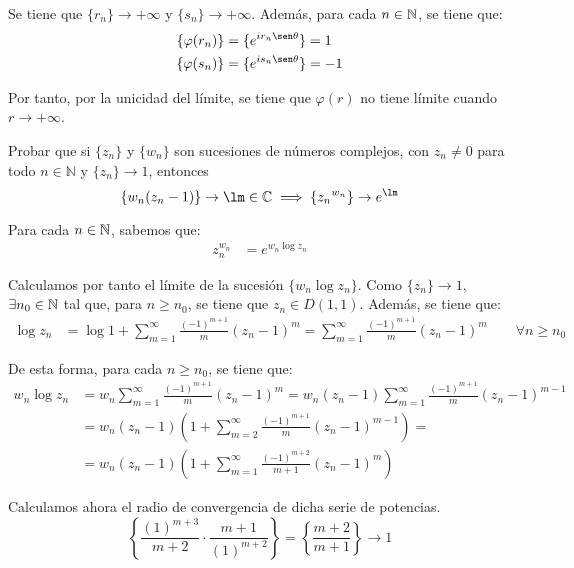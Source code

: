 \begin{ejercicio}
\begin{itemize}
        Se tiene que $\{r_n\} \to +\infty$ y $\{s_n\} \to +\infty$. Además, para cada $n\in \mathbb{N}$, se tiene que:
        \begin{align*}
            \{\varphi(r_n)\} &= \{e^{ir_n\sen\theta}\} = 1\\
            \{\varphi(s_n)\} &= \{e^{is_n\sen\theta}\} = -1
        \end{align*}

        Por tanto, por la unicidad del límite, se tiene que $\varphi(r)$ no tiene límite cuando $r\to +\infty$.
    \end{itemize}
\end{ejercicio}

\begin{ejercicio}
    Probar que si $\{z_n\}$ y $\{w_n\}$ son sucesiones de números complejos, con $z_n \neq 0$ para todo $n \in \mathbb{N}$ y $\{z_n\} \to 1$, entonces
    \[
        \left\{w_n(z_n - 1)\right\} \to \lm \in \mathbb{C} \implies \left\{{z_n}^{w_n}\right\} \to e^{\lm}
    \]

    Para cada $n\in \mathbb{N}$, sabemos que:
    \begin{align*}
        z_n^{w_n} &= e^{w_n\log z_n}
    \end{align*}

    Calculamos por tanto el límite de la sucesión $\{w_n\log z_n\}$. Como $\{z_n\} \to 1$, $\exists n_0\in \mathbb{N}$ tal que, para $n\geq n_0$, se tiene que $z_n\in D(1,1)$. Además, se tiene que:
    \begin{align*}
        \log z_n &= \log 1 + \sum_{m=1}^\infty \frac{(-1)^{m+1}}{m}\left(z_n - 1\right)^m = \sum_{m=1}^\infty \frac{(-1)^{m+1}}{m}\left(z_n - 1\right)^m \qquad \forall n\geq n_0
    \end{align*}

    De esta forma, para cada $n\geq n_0$, se tiene que:
    \begin{align*}
        w_n\log z_n &= w_n\sum_{m=1}^\infty \frac{(-1)^{m+1}}{m}\left(z_n - 1\right)^m
        = w_n(z_n - 1)\sum_{m=1}^\infty \frac{(-1)^{m+1}}{m}\left(z_n - 1\right)^{m-1} \\ &= w_n(z_n - 1)\left(1+\sum_{m=2}^\infty \frac{(-1)^{m+1}}{m}\left(z_n - 1\right)^{m-1}\right)
        =\\&= w_n(z_n - 1)\left(1+\sum_{m=1}^\infty \frac{(-1)^{m+2}}{m+1}\left(z_n - 1\right)^{m}\right)     
    \end{align*}

    Calculamos ahora el radio de convergencia de dicha serie de potencias.
    \begin{equation*}
        \left\{\dfrac{(1)^{m+3}}{m+2}\cdot \dfrac{m+1}{(1)^{m+2}}\right\} = \left\{\dfrac{m+2}{m+1}\right\}\to 1
    \end{equation*}


\end{ejercicio}
